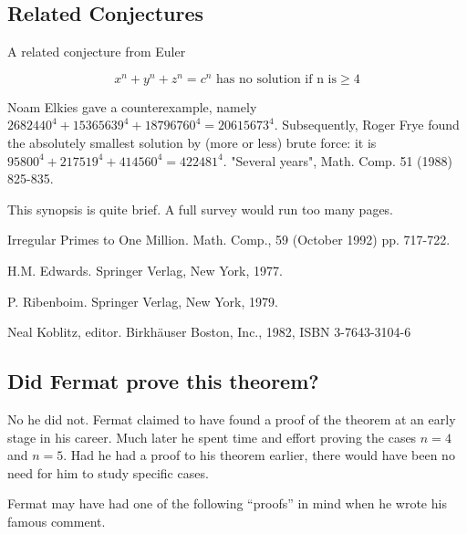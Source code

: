 \subsection{Related Conjectures}

 A related conjecture from Euler

\[ x^n + y^n + z^n = c^n \mbox{ has no solution if n is} \geq 4 \]

Noam Elkies gave a counterexample, namely $2682440^4 + 15365639^4 +
18796760^4 = 20615673^4$. Subsequently, Roger Frye found the
absolutely smallest solution by (more or less) brute force: it is
$95800^4 + 217519^4 + 414560^4 = 422481^4$.  "Several years",
Math. Comp. 51 (1988) 825-835.
 

   This synopsis is quite brief. A full survey would run too many pages.

    \Ref

            {Irregular Primes to One Million.}
            {Math. Comp.,}
            {59 (October 1992) pp. 717-722.}

         {H.M. Edwards.}
         {Springer Verlag, New York, 1977.}

         {P. Ribenboim.}
         {Springer Verlag, New York, 1979.}

         {Neal Koblitz, editor.}
         {Birkh\"auser Boston, Inc., 1982, ISBN 3-7643-3104-6}


\subsection{Did Fermat prove this theorem?}


No he did not. Fermat claimed to have found a proof of the theorem
at an early stage in his career. Much later he spent time and effort
proving the cases $n=4$ and $n=5$. Had he had a proof to his theorem 
earlier, there would have been no need for him to study specific cases.

Fermat may have had one of the following ``proofs'' in mind when
he wrote his famous comment.


